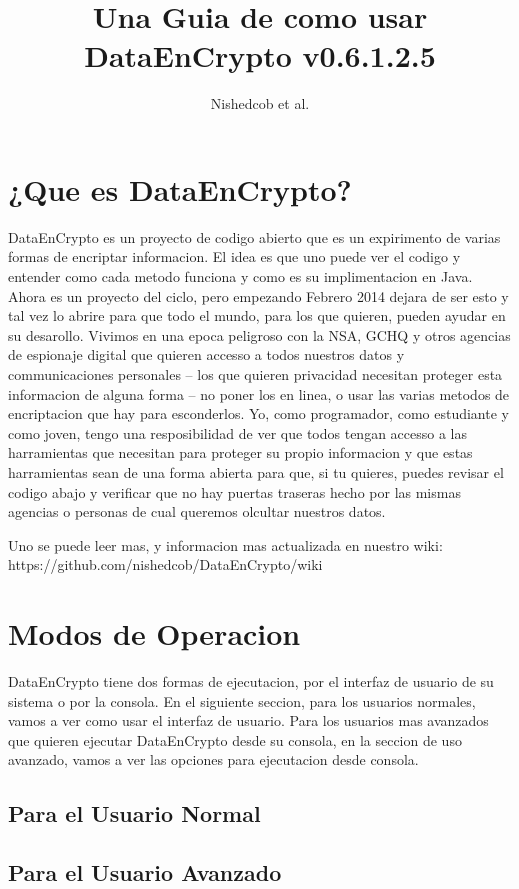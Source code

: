 \documentclass{article}
\author{Nishedcob et al.}
\title{Una Guia de como usar DataEnCrypto v0.6.1.2.5}
\begin{document}
	\maketitle
	\tableofcontents
	\section{¿Que es DataEnCrypto?}
		DataEnCrypto es un proyecto de codigo abierto que es un expirimento de varias formas de encriptar informacion. El idea es que uno puede ver el codigo y entender como cada metodo funciona y como es su implimentacion en Java. Ahora es un proyecto del ciclo, pero empezando Febrero 2014 dejara de ser esto y tal vez lo abrire para que todo el mundo, para los que quieren, pueden ayudar en su desarollo. Vivimos en una epoca peligroso con la NSA, GCHQ y otros agencias de espionaje digital que quieren accesso a todos nuestros datos y communicaciones personales -- los que quieren privacidad necesitan proteger esta informacion de alguna forma -- no poner los en linea, o usar las varias metodos de encriptacion que hay para esconderlos. Yo, como programador, como estudiante y como joven, tengo una resposibilidad de ver que todos tengan accesso a las harramientas que necesitan para proteger su propio informacion y que estas harramientas sean de una forma abierta para que, si tu quieres, puedes revisar el codigo abajo y verificar que no hay puertas traseras hecho por las mismas agencias o personas de cual queremos olcultar nuestros datos.

		Uno se puede leer mas, y informacion mas actualizada en nuestro wiki: https://github.com/nishedcob/DataEnCrypto/wiki
	\section{Modos de Operacion}
		DataEnCrypto tiene dos formas de ejecutacion, por el interfaz de usuario de su sistema o por la consola. En el siguiente seccion, para los usuarios normales, vamos a ver como usar el interfaz de usuario. Para los usuarios mas avanzados que quieren ejecutar DataEnCrypto desde su consola, en la seccion de uso avanzado, vamos a ver las opciones para ejecutacion desde consola.
		\subsection{Para el Usuario Normal}
		\subsection{Para el Usuario Avanzado}
\end{document}
